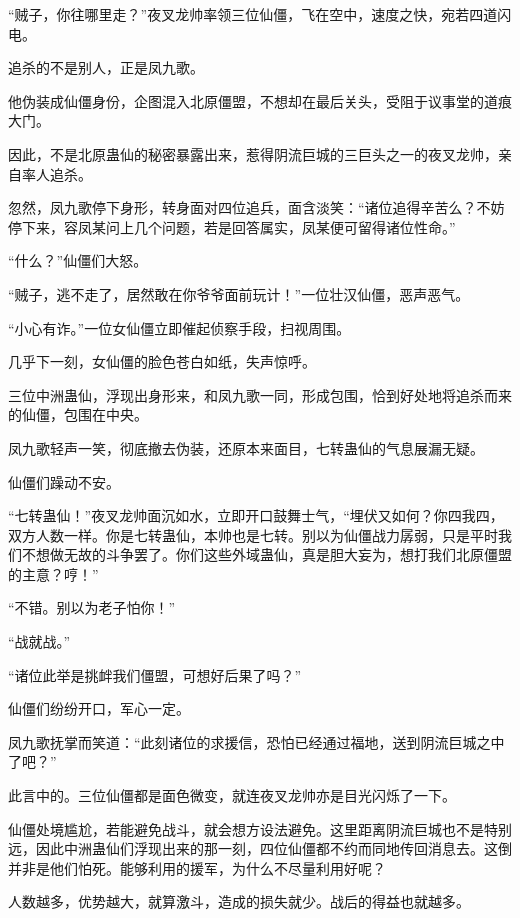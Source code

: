 
\begin{this_body}

“贼子，你往哪里走？”夜叉龙帅率领三位仙僵，飞在空中，速度之快，宛若四道闪电。

追杀的不是别人，正是凤九歌。

他伪装成仙僵身份，企图混入北原僵盟，不想却在最后关头，受阻于议事堂的道痕大门。

因此，不是北原蛊仙的秘密暴露出来，惹得阴流巨城的三巨头之一的夜叉龙帅，亲自率人追杀。

忽然，凤九歌停下身形，转身面对四位追兵，面含淡笑：“诸位追得辛苦么？不妨停下来，容凤某问上几个问题，若是回答属实，凤某便可留得诸位性命。”

“什么？”仙僵们大怒。

“贼子，逃不走了，居然敢在你爷爷面前玩计！”一位壮汉仙僵，恶声恶气。

“小心有诈。”一位女仙僵立即催起侦察手段，扫视周围。

几乎下一刻，女仙僵的脸色苍白如纸，失声惊呼。

三位中洲蛊仙，浮现出身形来，和凤九歌一同，形成包围，恰到好处地将追杀而来的仙僵，包围在中央。

凤九歌轻声一笑，彻底撤去伪装，还原本来面目，七转蛊仙的气息展漏无疑。

仙僵们躁动不安。

“七转蛊仙！”夜叉龙帅面沉如水，立即开口鼓舞士气，“埋伏又如何？你四我四，双方人数一样。你是七转蛊仙，本帅也是七转。别以为仙僵战力孱弱，只是平时我们不想做无故的斗争罢了。你们这些外域蛊仙，真是胆大妄为，想打我们北原僵盟的主意？哼！”

“不错。别以为老子怕你！”

“战就战。”

“诸位此举是挑衅我们僵盟，可想好后果了吗？”

仙僵们纷纷开口，军心一定。

凤九歌抚掌而笑道：“此刻诸位的求援信，恐怕已经通过福地，送到阴流巨城之中了吧？”

此言中的。三位仙僵都是面色微变，就连夜叉龙帅亦是目光闪烁了一下。

仙僵处境尴尬，若能避免战斗，就会想方设法避免。这里距离阴流巨城也不是特别远，因此中洲蛊仙们浮现出来的那一刻，四位仙僵都不约而同地传回消息去。这倒并非是他们怕死。能够利用的援军，为什么不尽量利用好呢？

人数越多，优势越大，就算激斗，造成的损失就少。战后的得益也就越多。


\end{this_body}
